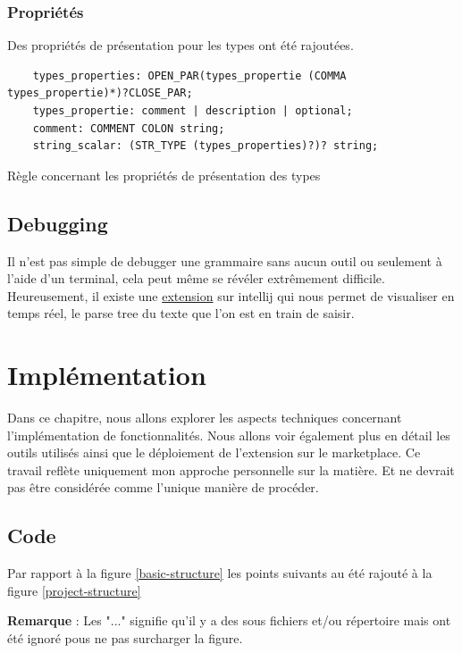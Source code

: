 \documentclass[
    iict, %
    il, %
]{heig-tb}
\begin{document}
\subsection{Propriétés}

Des propriétés de présentation pour les types ont été rajoutées.

\begin{listing}[!ht]
    \begin{verbatim}
    types_properties: OPEN_PAR(types_propertie (COMMA types_propertie)*)?CLOSE_PAR;
    types_propertie: comment | description | optional;
    comment: COMMENT COLON string;
    string_scalar: (STR_TYPE (types_properties)?)? string;
    \end{verbatim}
    \caption{Règle concernant les propriétés de présentation des types}
    \label{types_properties-rule}
\end{listing}

\section{Debugging}

Il n'est pas simple de debugger une grammaire sans aucun outil ou seulement à l'aide d'un terminal, cela peut même se révéler extrêmement difficile.
Heureusement, il existe une \href{https://plugins.jetbrains.com/plugin/7358-antlr-v4}{extension} sur intellij qui nous permet de visualiser en temps réel, le parse tree du texte que l'on est en train de saisir.

\chapter{Implémentation}
Dans ce chapitre, nous allons explorer les aspects techniques concernant l'implémentation de fonctionnalités. Nous allons voir également plus en détail les outils utilisés ainsi que le déploiement de l'extension sur le marketplace.
Ce travail reflète uniquement mon approche personnelle sur la matière. Et ne devrait pas être considérée comme l'unique manière de procéder.

\section{Code}

Par rapport à la figure \ref{basic-structure}
les points suivants au été rajouté à la figure \ref{project-structure}

\textbf{Remarque} : Les "..." signifie qu'il y a des sous fichiers et/ou répertoire mais ont été ignoré pous ne pas surcharger
la figure.
\end{document}
